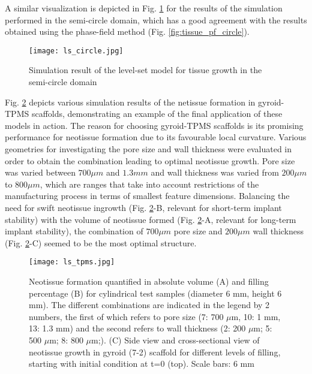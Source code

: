 A similar visualization is depicted in  Fig. \ref{fig:tissue_ls_circle} for the results of the simulation performed in the semi-circle domain, which has a good agreement with the results obtained using the phase-field method (Fig. \ref{fig:tissue_pf_circle}).


\begin{figure}
\medskip
\centering
\texttt{[image: ls\_circle.jpg]}
\caption[Simulation result of the level-set model for tissue growth in the semi-circle domain]{Simulation result of the level-set model for tissue growth in the semi-circle domain}
\label{fig:tissue_ls_circle}
\end{figure}


Fig. \ref{fig:tissue_ls_tpms} depicts various simulation results of the netissue formation in gyroid-TPMS scaffolds, demonstrating an example of the final application of these models in action. The reason for choosing gyroid-TPMS  scaffolds is its promising performance for neotissue formation due to its favourable local curvature. Various geometries for investigating the pore size and wall thickness were evaluated in order to obtain the combination leading to optimal neotissue growth. Pore size was varied between $700  \mu m$ and $1.3 mm $ and wall thickness was varied from $200 \mu m $ to $800 \mu m$, which are ranges that take into account restrictions of the manufacturing process in terms of smallest feature dimensions. Balancing the need for swift neotissue ingrowth (Fig. \ref{fig:tissue_ls_tpms}-B, relevant for short-term implant stability) with the volume of neotissue formed (Fig. \ref{fig:tissue_ls_tpms}-A, relevant for long-term implant stability), the combination of $700 \mu m$ pore size and $200 \mu m $ wall thickness (Fig. \ref{fig:tissue_ls_tpms}-C) seemed to be the most optimal structure. 


\begin{figure}
\medskip
\centering
\texttt{[image: ls\_tpms.jpg]}
\caption[Simulation results of the level-set model for neotissue formation on TPMS scaffolds]{Neotissue formation quantified in absolute volume (A) and filling percentage (B) for cylindrical test samples (diameter 6 mm, height 6 mm). The different combinations are indicated in the legend by 2 numbers, the first of which refers to pore size (7: 700 $\mu$m, 10: 1 mm, 13: 1.3 mm) and the second refers to wall thickness (2: 200 $\mu$m; 5: 500 $\mu$m; 8: 800 $\mu$m;). (C) Side view and cross-sectional view of neotissue growth in gyroid (7-2) scaffold for different levels of filling, starting with initial condition at t=0 (top). Scale bars: 6 mm}
\label{fig:tissue_ls_tpms}
\end{figure}



